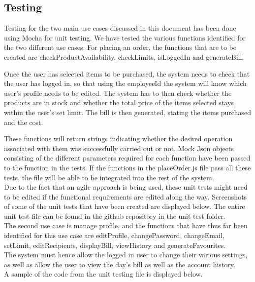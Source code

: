 \documentclass[a4paper,12pt]{article}
\begin{document}
\subsection{Testing}

Testing for the two main use cases discussed in this document has been done using Mocha for unit testing. We have tested the various functions identified for the two different use cases. For placing an order, the functions that are to be created are checkProductAvailability, checkLimits, isLoggedIn and generateBill. 

Once the user has selected items to be purchased, the system needs to check that the user has logged in, so that using the employeeId the system will know which user's profile needs to be edited. The system has to then check whether the products are in stock and whether the total price of the items selected stays within the user's set limit. The bill is then generated, stating the items purchased and the cost.

These functions will return strings indicating whether the desired operation associated with them was successfully carried out or not. Mock Json objects consisting of the different parameters required for each function have been passed to the function in the tests. If the functions in the placeOrder.js file pass all these tests, the file will be able to be integrated into the rest of the system. 
\\
Due to the fact that an agile approach is being used, these unit tests might need to be edited if the functional requirements are edited along the way. Screenshots of some of the unit tests that have been created are displayed below. The entire unit test file can be found in the github repository in the unit test folder.  
\\
The second use case is manage profile, and the functions that have thus far been identified for this use case are editProfile, changePassword, changeEmail, setLimit, editRecipients, displayBill, viewHistory and generateFavourites. 
\\
The system must hence allow the logged in user to change their various settings, as well as allow the user to view the day's bill as well as the account history.
\\
A sample of the code from the unit testing file is displayed below.
 
\end{document}
